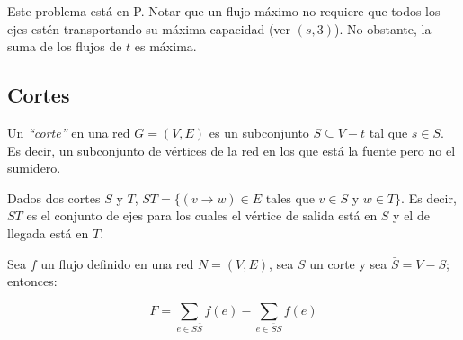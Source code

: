 \raggedright
  \bigskip
  \begin{center}
\end{center}

Este problema est\'a en P. Notar que un flujo m\'aximo no requiere que todos los ejes est\'en transportando su m\'axima capacidad (ver $(s,3)$). No obstante, la suma de los flujos de $t$ es m\'axima.

\newpage
\subsection{Cortes}

Un \emph{``corte''} en una red $G = (V, E)$ es un subconjunto $S \subseteq V - {t}$ tal que $s \in S$. Es decir, un subconjunto de v\'ertices de la red en los que est\'a la fuente pero no el sumidero.

Dados dos cortes $S$ y $T$, $ST = \{ (v \rightarrow w) \in E \textrm{ tales que } v \in S \textrm{ y } w \in T \}$. Es decir, $ST$ es el conjunto de ejes para los cuales el v\'ertice de salida est\'a en $S$ y el de llegada est\'a en $T$.

Sea $f$ un flujo definido en una red $N = (V, E)$, sea $S$ un corte y sea $\bar{S} = V - S$; entonces:

\[
F = \sum_{e \in S\bar{S}} f(e) - \sum_{e \in \bar{S}S} f(e)
\]

